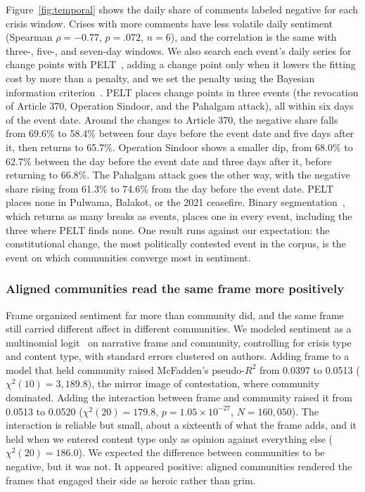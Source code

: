 
Figure~\ref{fig:temporal} shows the daily share of comments labeled negative for each crisis window. Crises with more comments have less volatile daily sentiment (Spearman $\rho = -0.77$, $p = .072$, $n = 6$), and the correlation is the same with three-, five-, and seven-day windows. We also search each event's daily series for change points with PELT~\cite{killick2012pelt}, adding a change point only when it lowers the fitting cost by more than a penalty, and we set the penalty using the Bayesian information criterion~\cite{schwarz1978estimating}. PELT places change points in three events (the revocation of Article 370, Operation Sindoor, and the Pahalgam attack), all within six days of the event date. Around the changes to Article 370, the negative share falls from 69.6\% to 58.4\% between four days before the event date and five days after it, then returns to 65.7\%. Operation Sindoor shows a smaller dip, from 68.0\% to 62.7\% between the day before the event date and three days after it, before returning to 66.8\%. The Pahalgam attack goes the other way, with the negative share rising from 61.3\% to 74.6\% from the day before the event date. PELT places none in Pulwama, Balakot, or the 2021 ceasefire. Binary segmentation~\cite{truong2020selective}, which returns as many breaks as events, places one in every event, including the three where PELT finds none. One result runs against our expectation: the constitutional change, the most politically contested event in the corpus, is the event on which communities converge most in sentiment.

\subsubsection{Aligned communities read the same frame more positively}
\label{sec:results-affect}

Frame organized sentiment far more than community did, and the same frame still carried different affect in different communities. We modeled sentiment as a multinomial logit~\cite{king2000interpretation} on narrative frame and community, controlling for crisis type and content type, with standard errors clustered on authors. Adding frame to a model that held community raised McFadden's pseudo-$R^2$ from 0.0397 to 0.0513 ($\chi^2(10) = 3{,}189.8$), the mirror image of contestation, where community dominated. Adding the interaction between frame and community raised it from 0.0513 to 0.0520 ($\chi^2(20) = 179.8$, $p = 1.05 \times 10^{-27}$, $N = 160{,}050$). The interaction is reliable but small, about a sixteenth of what the frame adds, and it held when we entered content type only as opinion against everything else ($\chi^2(20) = 186.0$). We expected the difference between communities to be negative, but it was not. It appeared positive: aligned communities rendered the frames that engaged their side as heroic rather than grim.


